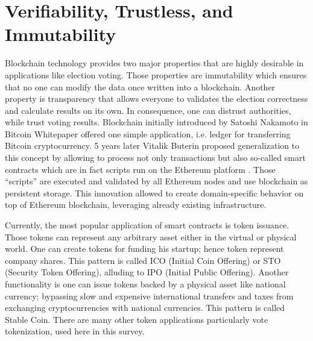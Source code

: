 \documentclass[runningheads]{llncs}
\begin{document}
\section{Verifiability, Trustless, and Immutability}
Blockchain technology provides two major properties that are highly desirable in applications like election voting. Those properties are immutability which ensures that no one can modify the data once written into a blockchain. 
Another property is transparency that allows everyone to validates the election correctness and calculate results on its own. In consequence, one can distrust authorities, while trust voting results. 
Blockchain initially introduced by Satoshi Nakamoto in Bitcoin Whitepaper \cite{nakamoto2008bitcoin} 
offered one simple application, i.e. ledger for transferring Bitcoin cryptocurrency. 5 years later Vitalik Buterin proposed generalization to this concept by allowing to process not only transactions but also so-called smart contracts which are in fact scripts run on the Ethereum platform \cite{buterin2013ethereum}. Those “scripts” are executed and validated by all Ethereum nodes and use blockchain as persistent storage. This innovation allowed to create domain-specific behavior on top of Ethereum blockchain, leveraging already existing infrastructure.

Currently, the most popular application of smart contracts is token issuance. Those tokens can represent any arbitrary asset either in the virtual or physical world. One can create tokens for funding his startup; hence token represent company shares. This pattern is called ICO (Initial Coin Offering) or STO (Security Token Offering), alluding to IPO (Initial Public Offering). 
Another functionality is one can issue tokens backed by a physical asset like national currency; bypassing slow and expensive international transfers and taxes from exchanging cryptocurrencies with national currencies. This pattern is called Stable Coin. There are many other token applications particularly vote tokenization, used here in this survey.

\end{document}
